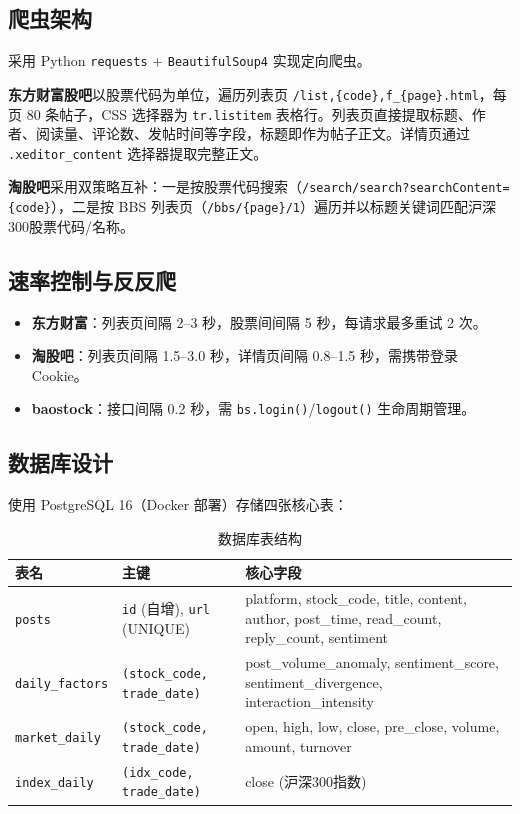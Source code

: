 \documentclass[12pt,a4paper]{ctexart}
\begin{document}
\subsection{爬虫架构}

采用 Python \texttt{requests} + \texttt{BeautifulSoup4} 实现定向爬虫。

\textbf{东方财富股吧}以股票代码为单位，遍历列表页 \texttt{/list,\{code\},f\_\{page\}.html}，每页 80 条帖子，CSS 选择器为 \texttt{tr.listitem} 表格行。列表页直接提取标题、作者、阅读量、评论数、发帖时间等字段，标题即作为帖子正文。详情页通过 \texttt{.xeditor\_content} 选择器提取完整正文。

\textbf{淘股吧}采用双策略互补：一是按股票代码搜索（\texttt{/search/search?searchContent=\{code\}}），二是按 BBS 列表页（\texttt{/bbs/\{page\}/1}）遍历并以标题关键词匹配沪深300股票代码/名称。

\subsection{速率控制与反反爬}

\begin{itemize}
    \item \textbf{东方财富}：列表页间隔 2--3 秒，股票间间隔 5 秒，每请求最多重试 2 次。
    \item \textbf{淘股吧}：列表页间隔 1.5--3.0 秒，详情页间隔 0.8--1.5 秒，需携带登录 Cookie。
    \item \textbf{baostock}：接口间隔 0.2 秒，需 \texttt{bs.login()}/\texttt{logout()} 生命周期管理。
\end{itemize}

\subsection{数据库设计}

使用 PostgreSQL 16（Docker 部署）存储四张核心表：

\begin{table}[H]
    \centering
    \caption{数据库表结构}
    \begin{tabular}{@{}lll@{}}
        \toprule
        \textbf{表名} & \textbf{主键} & \textbf{核心字段} \\
        \midrule
        \texttt{posts} & \texttt{id} (自增), \texttt{url} (UNIQUE) & platform, stock\_code, title, content, author, post\_time, read\_count, reply\_count, sentiment \\
        \texttt{daily\_factors} & \texttt{(stock\_code, trade\_date)} & post\_volume\_anomaly, sentiment\_score, sentiment\_divergence, interaction\_intensity \\
        \texttt{market\_daily} & \texttt{(stock\_code, trade\_date)} & open, high, low, close, pre\_close, volume, amount, turnover \\
        \texttt{index\_daily} & \texttt{(idx\_code, trade\_date)} & close (沪深300指数) \\
        \bottomrule
    \end{tabular}
\end{table}
\end{document}
